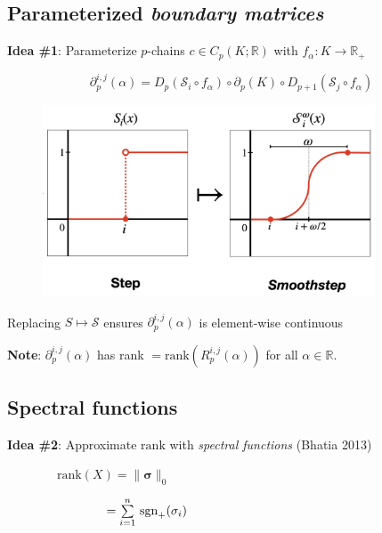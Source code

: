 \documentclass[
  letterpaper,
  DIV=11,
  numbers=noendperiod,
  oneside]{scrartcl}
\begin{document}
\hypertarget{parameterized-boundary-matrices}{%
\subsection{\texorpdfstring{Parameterized \emph{boundary
matrices}}{Parameterized boundary matrices}}\label{parameterized-boundary-matrices}}

\textbf{Idea \#1}: Parameterize \(p\)-chains
\(c \in C_p(K; \mathbb{R})\) with \(f_\alpha : K \to \mathbb{R}_+\)

\[ \partial_p^{i,j}(\alpha) = D_p(\mathcal{S}_i \circ f_\alpha) \circ \partial_p(K) \circ D_{p+1}(\mathcal{S}_j \circ f_\alpha) \]

\begin{figure}

{\centering \includegraphics[width=0.88\textwidth,height=1\textheight]{smoothstep.png}

}

\end{figure}

Replacing \(S \mapsto \mathcal{S}\) ensures \(\partial_p^{i,j}(\alpha)\)
is element-wise continuous

\textbf{Note}: \(\partial_p^{i,j}(\alpha)\) has rank
\(= \mathrm{rank}(R_p^{i,j}(\alpha))\) for all
\(\alpha \in \mathbb{R}\).

\hypertarget{spectral-functions}{%
\subsection{Spectral functions}\label{spectral-functions}}

\textbf{Idea \#2}: Approximate \(\mathrm{rank}\) with \emph{spectral
functions} (Bhatia 2013)

\(\quad\quad\quad\quad \mathrm{rank}(X) = \lVert \mathbf{\sigma} \rVert_0\)

\(\quad\quad\quad\quad \hphantom{\mathrm{rank}(X)} = \sum\limits_{i=1}^{n} \, \mathrm{sgn}_+(\sigma_i)\)
\end{document}
